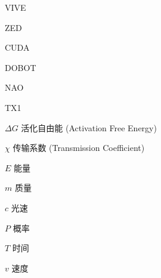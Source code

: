 \begin{denotation}[3cm]
\item[VIVE] 
\item[ZED] 
\item[CUDA] 
\item[DOBOT] 
\item[NAO] 
\item[TX1] 

\item[$\Delta G$] 活化自由能 (Activation Free Energy)
\item[$\chi$] 传输系数 (Transmission Coefficient)
\item[$E$] 能量
\item[$m$] 质量
\item[$c$] 光速
\item[$P$] 概率
\item[$T$] 时间
\item[$v$] 速度

\end{denotation}
